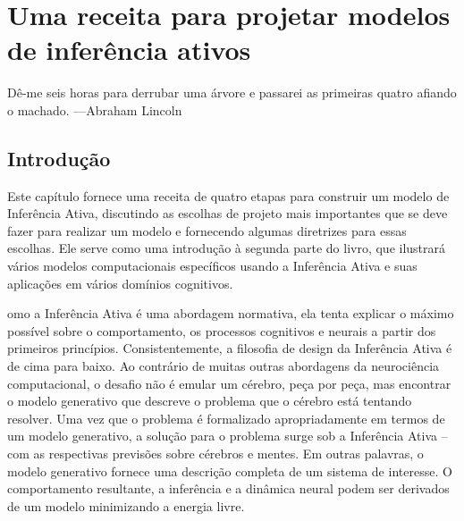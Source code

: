\documentclass[
  12pt,
]{book}
\begin{document}
\hypertarget{uma-receita-para-projetar-modelos-de-inferuxeancia-ativos}{%
\chapter{Uma receita para projetar modelos de inferência ativos}\label{uma-receita-para-projetar-modelos-de-inferuxeancia-ativos}}

Dê-me seis horas para derrubar uma árvore e passarei as primeiras quatro afiando o machado. ---Abraham Lincoln

\hypertarget{introduuxe7uxe3o-5}{%
\section{Introdução}\label{introduuxe7uxe3o-5}}

Este capítulo fornece uma receita de quatro etapas para construir um modelo de Inferência Ativa, discutindo as escolhas de projeto mais importantes que se deve fazer para realizar um modelo e fornecendo algumas diretrizes para essas escolhas. Ele serve como uma introdução à segunda parte do livro, que ilustrará vários modelos computacionais específicos usando a Inferência Ativa e suas aplicações em vários domínios cognitivos.

omo a Inferência Ativa é uma abordagem normativa, ela tenta explicar o máximo possível sobre o comportamento, os processos cognitivos e neurais a partir dos primeiros princípios. Consistentemente, a filosofia de design da Inferência Ativa é de cima para baixo. Ao contrário de muitas outras abordagens da neurociência computacional, o desafio não é emular um cérebro, peça por peça, mas encontrar o modelo generativo que descreve o problema que o cérebro está tentando resolver. Uma vez que o problema é formalizado apropriadamente em termos de um modelo generativo, a solução para o problema surge sob a Inferência Ativa -- com as respectivas previsões sobre cérebros e mentes. Em outras palavras, o modelo generativo fornece uma descrição completa de um sistema de interesse. O comportamento resultante, a inferência e a dinâmica neural podem ser derivados de um modelo minimizando a energia livre.
\end{document}
